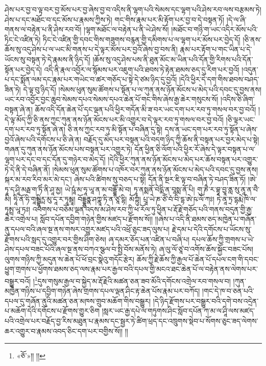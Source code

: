 ཤེས་པར་བྱ་བ་ལྟ་བར་བྱ་མོས་པར་བྱ་ཞེས་བྱ་བ་འདིས་ནི་ལྷག་པའི་སེམས་དང་ལྷག་པའི་ཤེས་རབ་ལས་བརྩམས་ཏེ། ཤེས་པ་དང་མཐོང་བ་དང་མོས་པ་རྣམས་ཀྱིས་ཏེ། གང་གིས་རྣམ་པར་མི་རྟོག་པར་བྱ་བ་དེ་བསྟན་ཏོ། །དེ་ལ་ཞི་གནས་ལ་བརྟེན་པ་ནི་ཤེས་རབ་བོ། །ལྷག་མཐོང་ལ་བརྟེན་པ་ནི་ཡེ་ཤེས་སོ། །མཐོང་བ་གཉི་ག་ཡང་འདིར་མོས་པའི་ཏིང་ངེ་འཛིན་ཏེ། ཏིང་ངེ་འཛིན་གྱི་དབང་གིས་གཟུགས་བརྙན་གྱི་དམིགས་པ་ལ་ལྷག་པར་མོས་པར་བྱེད་དོ། །ཅི་ནས་ཆོས་སུ་འདུ་ཤེས་པ་ལ་ཡང་མི་གནས་པ་དེ་ལྟར་མོས་པར་བྱའོ་ཞེས་བྱ་བས་ནི། རྣམ་པར་རྟོག་པ་གང་ཡིན་པ་དེ་ཡོངས་སུ་བསྟན་ཏེ་དེ་རྣམས་ནི་ཉིད་དོ། །ཆོས་སུ་འདུ་ཤེས་པས་ནི་ཐུན་མོང་མ་ཡིན་པའི་དོན་གྱི་རིགས་པའི་དོན་སྟོན་པར་བྱེད་དེ། འདི་ནི་རྣལ་འབྱོར་ལ་སྙོམས་པར་འཇུག་པའི་ཐབས་ཏེ་རྟེན་ཐམས་ཅད་དུ་རིག་པར་བྱའོ། །འདུན་པ་དང་སྨོན་ལམ་དང་རྣམ་པར་གཡེང་བ་ཚར་གཅོད་པ་སྟེ་དེ་ཙམ་ཉིད་དུ་བྱའོ། །དེའི་ཕྱིར་དེ་དག་གིས་ཐབས་བཤད་ཟིན་ཏེ། དེ་ལྟ་བུ་ཉིད་དོ། །སེམས་ཕུན་སུམ་ཚོགས་པ་སྟོན་པ་ལ་ཀུན་ནས་ཉོན་མོངས་པ་མེད་པའི་དབང་དུ་བྱས་ནས། ཡང་རབ་འབྱོར་བྱང་ཆུབ་སེམས་དཔའ་སེམས་དཔའ་ཆེན་པོ་གང་གིས་ཞེས་རྒྱ་ཆེར་གསུངས་སོ། །འདིས་ཅི་ཞིག་བསྟན་ཞེ་ན། ཆོས་འདི་དོན་ཆེན་པོ་དང་ལྡན་པའི་ཕྱིར་གདོན་མི་ཟ་བར་ཡང་དག་པར་རབ་ཏུ་གསལ་བར་བྱ་བའོ། །དེ་ལྟ་མོད་ཀྱི་ཅི་ནས་ཀྱང་ཀུན་ནས་ཉོན་མོངས་པར་མི་འགྱུར་བ་དེ་ལྟར་རབ་ཏུ་གསལ་བར་བྱ་བའོ། །ཅི་ལྟར་ཡང་དག་པར་རབ་ཏུ་སྟོན་ཞེ་ན། ཅི་ནས་ཀྱང་རབ་ཏུ་མི་སྟོན་པ་བཞིན་དུ་སྟེ། དས་ན་ཡང་དག་པར་རབ་ཏུ་སྟོན་པ་ཞེས་བྱའོ་ཞེས་པའི་དགོངས་པ་ཅི་ཞེ་ན། བརྗོད་དུ་མེད་པར་བསྟན་པའི་བདག་ཉིད་ཀྱི་ཆོས་ནི་བསྟན་པར་བྱར་མེད་པ་སྟེ། གཞན་དུ་ཀུན་ནས་ཉོན་མོངས་པས་བསྟན་པར་འགྱུར་ཏེ། དོན་ཕྱིན་ཅི་ལོག་པའི་ཕྱིར་རོ་ཞེས་དེ་ལྟར་བསྟན་པ་ལ་ལྷག་པར་དང་བ་དང་དོན་དུ་གཉེར་བ་མེད་དོ། །དེའི་ཕྱིར་ཀུན་ནས་ཉོན་མོངས་པ་མེད་པར་ཆོས་བསྟན་པར་འགྱུར་ཏེ་དེ་ནི་དེ་བཞིན་ནོ། །སེམས་ཕུན་སུམ་ཚོགས་པ་འཁོར་བར་ཀུན་ནས་ཉོན་མོངས་པ་མེད་པའི་དབང་དུ་བྱས་ནས། སྐར་མ་རབ་རིབ་མར་མེ་དང་། ཞེས་པའི་ཚིགས་སུ་བཅད་པ་སྟེ། དོན་ནི་སྔར་ཇི་ལྟ་བ་བཞིན་ཏེ་བཤད་ཟིན་ཏོ། །ཨེ་ཏཱ་ད་ཤཱི་མརྠ་ག་ཏིཾ་ནི་ཤཱ་མྱ། ཡེ་ཥཱཾ་མ་ཧཱ་ཡཱ་ན་མ་བདྡྷཽ་མེ་བ། ཏཱ་ནསྨནོ་བེདྨི་ན་བཱསྨ་ནོ་པི། གུ་ཎཻ་ར་བྷཱ་བྱཱ་ནླ་སུ་ནཱ་ན་བཻ་མི། ཧཱི་ནོ་ཧི་གཱམྦྷཱིཪྻ་མུ་དཱ་ར་ཏཱམྦཱ། བོདྡྷུནྣ་ཤཀྣཱ་ཏི་ན་ཙཱ་དྷི། མོཀྟུཾ། པྲཱ་ཡེ་ཎ་ཙོཾ་བཾ་བི་དྷ་ཨེ་ཥ་ལོ་ཀཿ། ཏེ་ནཱ་ཏྲ་དྷརྨེ་ཁི་ལ་ཏཱམྤྲ་ཡཱ་ཏཿ། འཕགས་པ་བཅོམ་ལྡན་འདས་མ་ཤེས་རབ་ཀྱི་ཕ་རོལ་ཏུ་ཕྱིན་པ་རྡོ་རྗེ་གཅོད་པའི་གནས་བདུན་གྱི་རྒྱ་ཆེར་འགྲེལ་པ། སློབ་དཔོན་དབྱིག་གཉེན་གྱིས་མཛད་པ་རྫོགས་སོ།། །།ཞེས་པ་འདི་ནི་ཐམས་ཅད་མཁྱེན་པ་གཞོན་ནུ་དཔལ་བའི་ཞལ་སྔ་ནས་གསར་འགྱུར་མཛད་པའི་འཕྲོ་ཅུང་ཟད་ལུས་པ། རྗེ་དམ་པ་དེའི་དགོངས་པ་ཡོངས་སུ་རྫོགས་པའི་སླད་དུ་འགྱུར་བར་གྱིས་ཤིག་ཅེས། ཞྭ་དམར་ཅོད་པན་འཛིན་པ་བཞི་པ། དཔལ་ཆོས་ཀྱི་གྲགས་པ་ཡེ་ཤེས་དཔལ་བཟང་པོའི་ཞལ་སྔ་ནས་བཀའ་སྩལ་བ་སྤྱི་བོས་མནོས་ཏེ། ཞ་ལུ་ལོ་ཙཱ་བ་འགོས་ཆོས་སྐྱོང་བཟང་པོས། ལུགས་གཉིས་ཀྱི་མདུན་ས་ཆེན་པོ་ཕོ་བྲང་སྣེའུ་གདོང་རྩེར། ཆོས་ཀྱི་རྗེ་ཆོས་ཀྱི་རྒྱལ་པོ་ཆེན་པོ་དཔལ་ངག་གི་དབང་ཕྱུག་གྲགས་པ་ཕྱོགས་ཐམས་ཅད་ལས་རྣམ་པར་རྒྱལ་བའི་དཔལ་གྱི་མངའ་ཐང་ཆེན་པོ་ལ་བརྟེན་ནས་ལེགས་པར་བསྒྱུར་བའོ། །\footnote{«ཅོ་»།། །།}དུས་གསུམ་རྒྱལ་བ་སྐྱེད་མ་རྡོ་རྗེའི་མཚན་ཅན་ཟབ་མོའི་དགོངས་འགྲེལ་རབ་གསལ་བ། །ཀུན་མཁྱེན་གཉིས་པ་དབྱིག་གཉེན་ཞེས་གྲགས་དཔལ་ལྡན་ཤིང་རྟ་ཆེན་པོས་རྣམ་པར་བཀོད། །གང་དེ་ཁ་བ་ཅན་པའི་དཔལ་དུ་གཞོན་ནུའི་མཚན་ཅན་མཁས་གྲུབ་མཆོག་གིས་བསྒྱུར། །དེ་ཉིད་རྫོགས་པར་བསྒྱུར་བའི་དགེ་བས་འདྲེན་པ་མཆོག་དེའི་དགོངས་པ་རྫོགས་གྱུར་ཅིག །སླར་ཡང་རྒྱ་དཔེ་ལ་གཏུགས་ཤིང་སློབ་དཔོན་ཀ་མ་ལ་ཤཱི་ལས་མཛད་པའི་འགྲེལ་པར་བརྗོད་བྱ་རིས་མཐུན་པ་རྣམས་དང་སྦྱར་ཏེ་ཚིག་ཕྲད་དང་འཁྲུགས་སྡེབ་པ་སོགས་ཅུང་ཟད་ལེགས་ཆར་འགྱུར་བ་རྣམས་འབད་ཅིང་དག་པར་བགྱིས་སོ།། །།